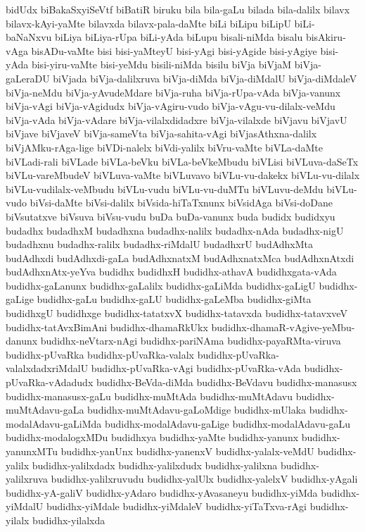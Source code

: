 {bidUdx
biBakaSxyiSeVtf
biBatiR
biruku
bila
bila-gaLu
bilada
bila-dalilx
bilavx
bilavx-kAyi-yaMte
bilavxda
bilavx-pala-daMte
biLi
biLipu
biLipU
biLi-baNaNxvu
biLiya
biLiya-rUpa
biLi-yAda
biLupu
bisali-niMda
bisalu
bisAkiru-vAga
bisADu-vaMte
bisi
bisi-yaMteyU
bisi-yAgi
bisi-yAgide
bisi-yAgiye
bisi-yAda
bisi-yiru-vaMte
bisi-yeMdu
bisili-niMda
bisilu
biVja
biVjaM
biVja-gaLeraDU
biVjada
biVja-dalilxruva
biVja-diMda
biVja-diMdalU
biVja-diMdaleV
biVja-neMdu
biVja-yAvudeMdare
biVja-ruha
biVja-rUpa-vAda
biVja-vanunx
biVja-vAgi
biVja-vAgidudx
biVja-vAgiru-vudo
biVja-vAgu-vu-dilalx-veMdu
biVja-vAda
biVja-vAdare
biVja-vilalxdidadxre
biVja-vilalxde
biVjavu
biVjavU
biVjave
biVjaveV
biVja-sameVta
biVja-sahita-vAgi
biVjasAthxna-dalilx
biVjAMku-rAga-lige
biVDi-nalelx
biVdi-yalilx
biVru-vaMte
biVLa-daMte
biVLadi-rali
biVLade
biVLa-beVku
biVLa-beVkeMbudu
biVLisi
biVLuva-daSeTx
biVLu-vareMbudeV
biVLuva-vaMte
biVLuvavo
biVLu-vu-dakekx
biVLu-vu-dilalx
biVLu-vudilalx-veMbudu
biVLu-vudu
biVLu-vu-duMTu
biVLuvu-deMdu
biVLu-vudo
biVsi-daMte
biVsi-dalilx
biVsida-hiTaTxnunx
biVsidAga
biVsi-doDane
biVsutatxve
biVsuva
biVsu-vudu
buDa
buDa-vanunx
buda
budidx
budidxyu
budadhx
budadhxM
budadhxna
budadhx-nalilx
budadhx-nAda
budadhx-nigU
budadhxnu
budadhx-ralilx
budadhx-riMdalU
budadhxrU
budAdhxMta
budAdhxdi
budAdhxdi-gaLa
budAdhxnatxM
budAdhxnatxMca
budAdhxnAtxdi
budAdhxnAtx-yeYva
budidhx
budidhxH
budidhx-athavA
budidhxgata-vAda
budidhx-gaLanunx
budidhx-gaLalilx
budidhx-gaLiMda
budidhx-gaLigU
budidhx-gaLige
budidhx-gaLu
budidhx-gaLU
budidhx-gaLeMba
budidhx-giMta
budidhxgU
budidhxge
budidhx-tatatxvX
budidhx-tatavxda
budidhx-tatavxveV
budidhx-tatAvxBimAni
budidhx-dhamaRkUkx
budidhx-dhamaR-vAgive-yeMbu-danunx
budidhx-neVtarx-nAgi
budidhx-pariNAma
budidhx-payaRMta-viruva
budidhx-pUvaRka
budidhx-pUvaRka-valalx
budidhx-pUvaRka-valalxdadxriMdalU
budidhx-pUvaRka-vAgi
budidhx-pUvaRka-vAda
budidhx-pUvaRka-vAdadudx
budidhx-BeVda-diMda
budidhx-BeVdavu
budidhx-manasusx
budidhx-manasusx-gaLu
budidhx-muMtAda
budidhx-muMtAdavu
budidhx-muMtAdavu-gaLa
budidhx-muMtAdavu-gaLoMdige
budidhx-mUlaka
budidhx-modalAdavu-gaLiMda
budidhx-modalAdavu-gaLige
budidhx-modalAdavu-gaLu
budidhx-modalogxMDu
budidhxya
budidhx-yaMte
budidhx-yanunx
budidhx-yanunxMTu
budidhx-yanUnx
budidhx-yanenxV
budidhx-yalalx-veMdU
budidhx-yalilx
budidhx-yalilxdadx
budidhx-yalilxdudx
budidhx-yalilxna
budidhx-yalilxruva
budidhx-yalilxruvudu
budidhx-yalUlx
budidhx-yalelxV
budidhx-yAgali
budidhx-yA-galiV
budidhx-yAdaro
budidhx-yAvasaneyu
budidhx-yiMda
budidhx-yiMdalU
budidhx-yiMdale
budidhx-yiMdaleV
budidhx-yiTaTxva-rAgi
budidhx-yilalx
budidhx-yilalxda
}
